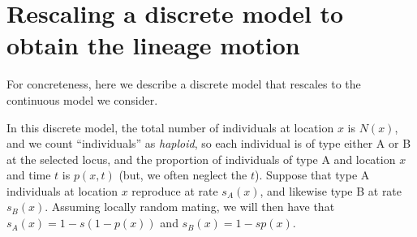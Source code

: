 \documentclass[11pt,letterpaper]{article}
\begin{document}







\appendix
\setcounter{table}{0}
\renewcommand{\thetable}{S\arabic{table}}
\setcounter{figure}{0}
\renewcommand{\thefigure}{S\arabic{figure}}


\section{Rescaling a discrete model to obtain the lineage motion}
\label{apx:lineage_derivation}

For concreteness, here we describe a discrete model that rescales to the continuous model we consider.

In this discrete model, the total number of individuals at location $x$ is $N(x)$,
and we count ``individuals'' as \emph{haploid},
so each individual is of type either A or B at the selected locus,
and the proportion of individuals of type A and location $x$ and time $t$ is $p(x,t)$
(but, we often neglect the $t$).
Suppose that type A individuals at location $x$ reproduce at rate $s_A(x)$, 
and likewise type B at rate $s_B(x)$.
Assuming locally random mating, we will then have that
$s_A(x) = 1 - s (1-p(x))$ and $s_B(x) = 1 - s p(x)$.
\end{document}
